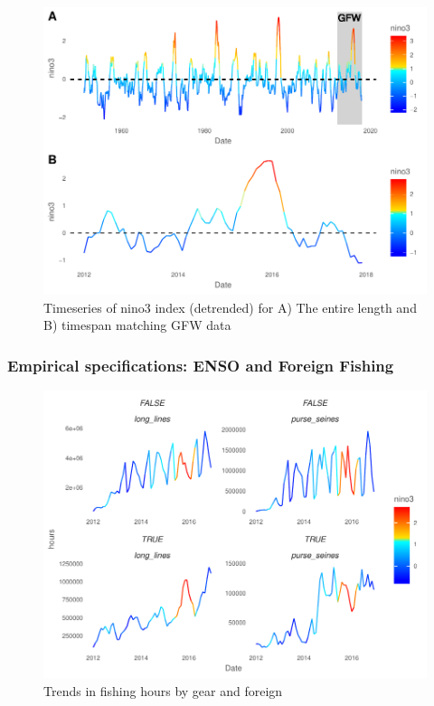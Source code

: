\documentclass[11pt]{article}
\begin{document}
\begin{figure}
\centering
\includegraphics{img/nino_gfw.pdf}
\caption{Timeseries of nino3 index (detrended) for A) The entire length
and B) timespan matching GFW data}
\end{figure}

\subsubsection{Empirical specifications: ENSO and Foreign Fishing}
\label{ENSO_FF}

\begin{figure}
\centering
\includegraphics{img/trends_by_gear.pdf}
\caption{Trends in fishing hours by gear and foreign}
\end{figure}
\end{document}
